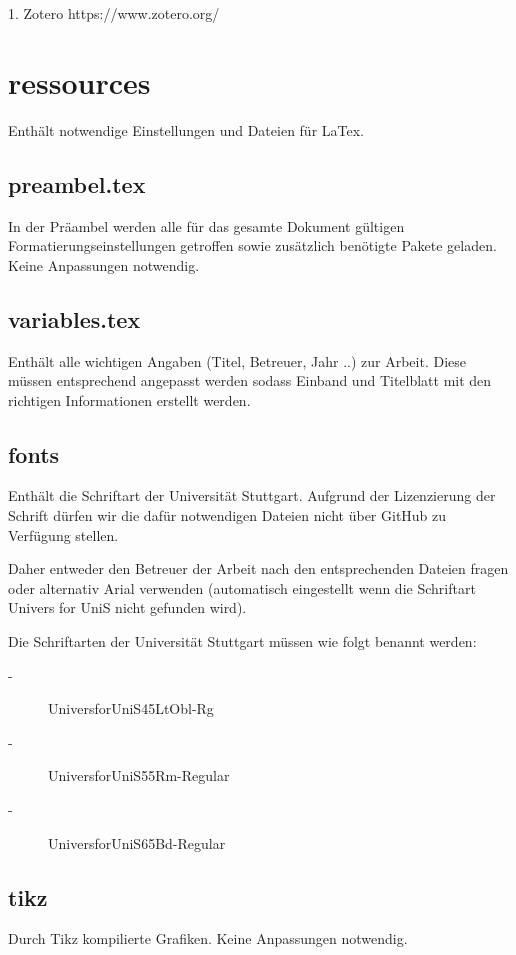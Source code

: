 1. Zotero https://www.zotero.org/

\newpage

\section*{ressources}

Enthält notwendige Einstellungen und Dateien für LaTex.

\subsection*{preambel.tex}

In der Präambel werden alle für das gesamte Dokument gültigen Formatierungseinstellungen getroffen sowie zusätzlich benötigte Pakete geladen. Keine Anpassungen notwendig.

\subsection*{variables.tex}
\label{section:_E_ressources_variables}

Enthält alle wichtigen Angaben (Titel, Betreuer, Jahr ..) zur Arbeit. Diese müssen entsprechend angepasst werden sodass Einband und Titelblatt mit den richtigen Informationen erstellt werden.

\subsection*{fonts}
Enthält die Schriftart der Universität Stuttgart. Aufgrund der Lizenzierung der Schrift dürfen wir die dafür notwendigen Dateien nicht über GitHub zu Verfügung stellen. 

Daher entweder den Betreuer der Arbeit nach den entsprechenden Dateien fragen oder alternativ Arial verwenden (automatisch eingestellt wenn die Schriftart Univers for UniS nicht gefunden wird).

Die Schriftarten der Universität Stuttgart müssen wie folgt benannt werden:

\begin{description}
	\item[-] UniversforUniS45LtObl-Rg
	\item[-] UniversforUniS55Rm-Regular
	\item[-] UniversforUniS65Bd-Regular
\end{description}

\subsection*{tikz}
Durch Tikz kompilierte Grafiken. Keine Anpassungen notwendig.
